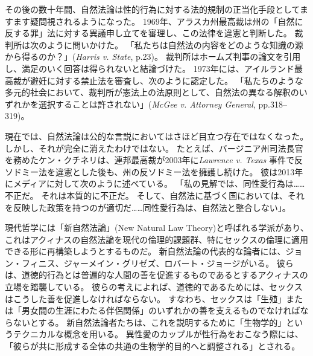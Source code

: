 \documentclass[paper=a4,book,openany]{jlreq}
\newcommand{\ig}[1]{}           %
\begin{document}
その後の数十年間、自然法論は性的行為に対する法的規制の正当化手段としてますます疑問視されるようになった。
1969年、アラスカ州最高裁は州の「自然に反する罪」法に対する異議申し立てを審理し、この法律を違憲と判断した。
裁判所は次のように問いかけた。
「私たちは自然法の内容をどのような知識の源から得るのか？」(\emph{Harris v. State},  p.23)。
裁判所はホームズ判事の論文を引用し、満足のいく回答は得られないと結論づけた。
1973年には、アイルランド最高裁が避妊に対する禁止法を審査し、次のように認定した。
「私たちのような多元的社会において、裁判所が憲法上の法原則として、自然法の異なる解釈のいずれかを選択することは許されない」(\emph{McGee v. Attorney General}, pp.318--319)。

現在では、自然法論は公的な言説においてはさほど目立つ存在ではなくなった。
しかし、それが完全に消えたわけではない。
たとえば、バージニア州司法長官を務めたケン・クチネリは、連邦最高裁が2003年に\emph{Lawrence v. Texas} 事件で反ソドミー法を違憲とした後も、州の反ソドミー法を擁護し続けた。
彼は2013年にメディアに対して次のように述べている。
「私の見解では、同性愛行為は……不正だ。
それは本質的に不正だ。
そして、自然法に基づく国においては、それを反映した政策を持つのが適切だ……同性愛行為は、自然法と整合しない」\citep{bump13:_virgin_is_retro}。

現代哲学には「新自然法論」(New Natural Law Theory)と呼ばれる学派があり、これはアクィナスの自然法論を現代の倫理的課題群、特にセックスの倫理に適用できる形に再構築しようとするものだ。
新自然法論の代表的な論者には、ジョン・フィニス、ジャーメイン・グリゼズ、ロバート・ジョージがいる。
彼らは、道徳的行為とは普遍的な人間の善を促進するものであるとするアクィナスの立場を踏襲している。
彼らの考えによれば、道徳的であるためには、セックスはこうした善を促進しなければならない。
すなわち、セックスは「生殖」または「男女間の生涯にわたる伴侶関係」のいずれかの善を支えるものでなければならないとする。
新自然法論者たちは、これを説明するために「生物学的」というテクニカルな概念を用いる。
異性愛のカップルが性行為をおこなう際には、「彼らが共に形成する全体の共通の生物学的目的へと調整される」とされる\citep[p.25]{girgis12:_what_marriag}。
\ig{Ryan T. Anderson}
\end{document}
